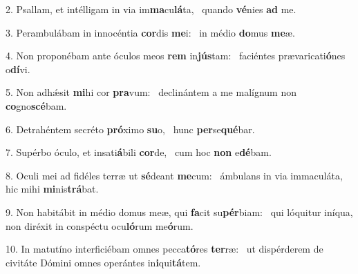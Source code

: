 2. Psallam, et intélligam in via im\textbf{ma}cu\textbf{lá}ta, \ast\  quando \textbf{vé}nies \textbf{ad} me.\

3. Perambulábam in innocéntia \textbf{cor}dis \textbf{me}i: \ast\  in médio \textbf{do}mus \textbf{me}æ.\

4. Non proponébam ante óculos meos \textbf{rem} in\textbf{jús}tam: \ast\  faciéntes prævaricati\textbf{ó}nes o\textbf{dí}vi.\

5. Non adhǽsit \textbf{mi}hi cor \textbf{pra}vum: \ast\  declinántem a me malígnum non \textbf{co}gno\textbf{scé}bam.\

6. Detrahéntem secréto \textbf{pró}ximo \textbf{su}o, \ast\  hunc \textbf{per}se\textbf{qué}bar.\

7. Supérbo óculo, et insati\textbf{á}bili \textbf{cor}de, \ast\  cum hoc \textbf{non} e\textbf{dé}bam.\

8. Oculi mei ad fidéles terræ ut \textbf{sé}deant \textbf{me}cum: \ast\  ámbulans in via immaculáta, hic mihi \textbf{mi}nis\textbf{trá}bat.\

9. Non habitábit in médio domus meæ, qui \textbf{fa}cit su\textbf{pér}biam: \ast\  qui lóquitur iníqua, non diréxit in conspéctu ocu\textbf{ló}rum me\textbf{ó}rum.\

10. In matutíno interficiébam omnes pecca\textbf{tó}res \textbf{ter}ræ: \ast\  ut dispérderem de civitáte Dómini omnes operántes in\textbf{i}qui\textbf{tá}tem.\

